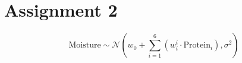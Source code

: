 \documentclass[a4paper, twocolumn]{article}
\begin{document}



    \section*{Assignment 2}

    \begin{equation} \label{eq:mse}
        \mathrm{Moisture} \sim \mathcal{N}(w_0 + \sum_{i=1}^6{(w_i^i \cdot \mathrm{Protein}_i)}, \sigma^2)
    \end{equation}
\end{document}

